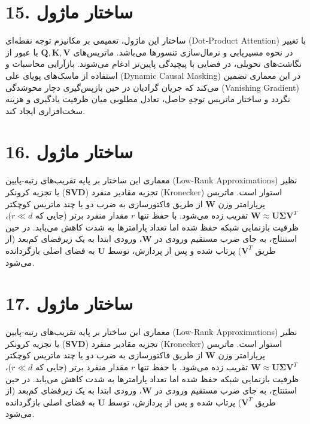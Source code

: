 \documentclass[12pt,a4paper]{report}
\begin{document}
\section*{15. ساختار ماژول }
ساختار این ماژول، تعمیمی بر مکانیزم توجه نقطه‌ای (Dot-Product Attention) با تغییر در نحوه مسیریابی و نرمال‌سازی تنسورها می‌باشد. ماتریس‌های $\mathbf{Q, K, V}$ با عبور از نگاشت‌های تحویلی، در فضایی با پیچیدگی پایین‌تر ادغام می‌شوند. بازآرایی محاسبات و استفاده از ماسک‌های پویای علی (Dynamic Causal Masking) در این معماری تضمین می‌کند که جریان گرادیان در حین بازپس‌گیری دچار محوشدگی (Vanishing Gradient) نگردد و ساختار ماتریس توجهِ حاصل، تعادل مطلوبی میان ظرفیت یادگیری و هزینه سخت‌افزاری ایجاد کند.

\section*{16. ساختار ماژول }
معماری این ساختار بر پایه تقریب‌های رتبه-پایین (Low-Rank Approximations) نظیر تجزیه مقادیر منفرد ($\mathbf{SVD}$) یا تجزیه کرونکر (Kronecker) استوار است. ماتریس پرپارامتر وزن $\mathbf{W}$ از طریق فاکتورسازی به ضرب دو یا چند ماتریس کوچکتر $\mathbf{W} \approx \mathbf{U} \mathbf{\Sigma} \mathbf{V}^T$ تقریب زده می‌شود. با حفظ تنها $r$ مقدار منفرد برتر (جایی که $r \ll d$)، ظرفیت بازنمایی شبکه حفظ شده اما تعداد پارامترها به شدت کاهش می‌یابد. در حین استنتاج، به جای ضرب مستقیم ورودی در $\mathbf{W}$، ورودی ابتدا به یک زیرفضای کم‌بعد (از طریق $\mathbf{V}^T$) پرتاب شده و پس از پردازش، توسط $\mathbf{U}$ به فضای اصلی بازگردانده می‌شود.

\section*{17. ساختار ماژول }
معماری این ساختار بر پایه تقریب‌های رتبه-پایین (Low-Rank Approximations) نظیر تجزیه مقادیر منفرد ($\mathbf{SVD}$) یا تجزیه کرونکر (Kronecker) استوار است. ماتریس پرپارامتر وزن $\mathbf{W}$ از طریق فاکتورسازی به ضرب دو یا چند ماتریس کوچکتر $\mathbf{W} \approx \mathbf{U} \mathbf{\Sigma} \mathbf{V}^T$ تقریب زده می‌شود. با حفظ تنها $r$ مقدار منفرد برتر (جایی که $r \ll d$)، ظرفیت بازنمایی شبکه حفظ شده اما تعداد پارامترها به شدت کاهش می‌یابد. در حین استنتاج، به جای ضرب مستقیم ورودی در $\mathbf{W}$، ورودی ابتدا به یک زیرفضای کم‌بعد (از طریق $\mathbf{V}^T$) پرتاب شده و پس از پردازش، توسط $\mathbf{U}$ به فضای اصلی بازگردانده می‌شود.
\end{document}
